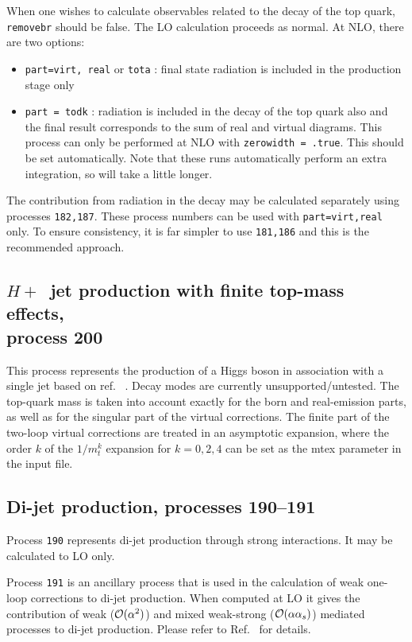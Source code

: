 \documentclass{article}
\begin{document}
{{{{{{When one wishes to calculate observables related to the decay of the top
quark, {\tt removebr} should be false.
The LO calculation proceeds as normal. At NLO, there are two options:
\begin{itemize}
\item {\tt part=virt, real} or {\tt tota} : final state radiation is included
in the production stage only
\item {\tt part = todk} : radiation is included in the decay of the top
quark also and the final result corresponds to the sum of real and virtual
diagrams. This process can only be performed at NLO with 
{\tt zerowidth = .true}. This should be set automatically.
Note that these runs automatically perform an extra integration, so
will take a little longer.
\end{itemize}

The contribution from radiation in the decay may be calculated separately using
processes {\tt 182,187}. These process numbers can be used with {\tt part=virt,real}
only. To ensure consistency, it is far simpler to use {\tt 181,186}
and this is the recommended approach.

\subsection{$H+$~jet production with finite top-mass effects,\\ process 200}
\label{subsec:hjetma}
This process represents the production of a Higgs boson in association with a single jet based on ref.~ \cite{Neumann:2016dny}. Decay modes are currently unsupported/untested. The top-quark mass is taken into account exactly for the born and real-emission parts, as well as for the singular part of the virtual corrections. The finite part of the two-loop virtual corrections are treated in an asymptotic expansion, where the order $k$ of the $1/m_t^{k}$ expansion for $k=0,2,4$ can be set as the mtex parameter in the input file.

\subsection{Di-jet production, processes 190--191}
\label{subsec:dijet}

Process {\tt 190} represents di-jet production through strong interactions.
It may be calculated to LO only.

Process {\tt 191} is an ancillary process that is used in the calculation of
weak one-loop corrections to di-jet production.  When computed at LO it gives the
contribution of weak (${\cal O}(\alpha^2)$) and mixed weak-strong (${\cal O}(\alpha\alpha_s)$)
mediated processes to di-jet production.  Please refer to Ref.~\cite{Campbell:2016dks} for details.

}}}}}}
\end{document}
